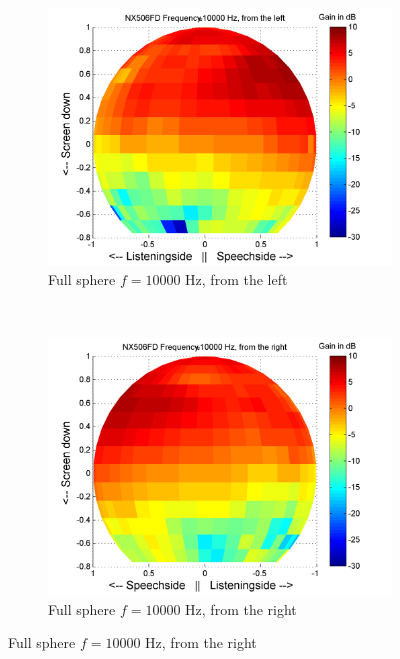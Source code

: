 \begin{figure}[t!]
        \begin{subfigure}[t]{0.5\textwidth}
			    \caption{Full sphere $f=10000$ Hz, from the left}
			    \label{fig:res_NX506_FD_sphere_left}
                \centering
    			\includegraphics[height=0.28\textheight]{afbeeldingen/plots/results/NX506FD_10000_left.png}
        \end{subfigure}~
        \begin{subfigure}[t]{0.5\textwidth}
			    \caption{Full sphere $f=10000$ Hz, from the right}
			    \label{fig:res_NX506_FD_sphere_right}
                \centering
    			\includegraphics[height=0.28\textheight]{afbeeldingen/plots/results/NX506FD_10000_right.png}
        \end{subfigure}
\end{figure}

